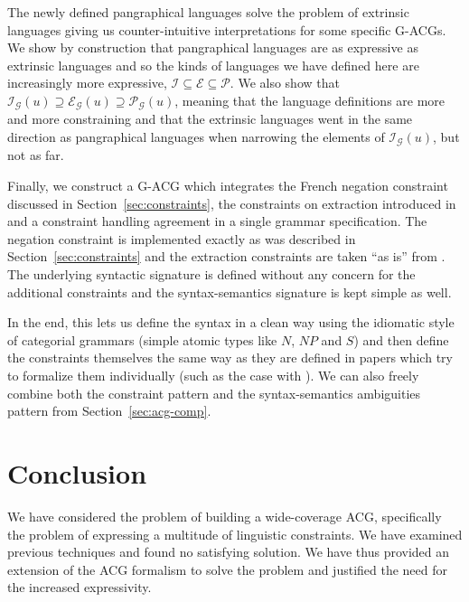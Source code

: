 \documentclass[twocolumn]{article}
\begin{document}
The newly defined pangraphical languages solve the problem of extrinsic
languages giving us counter-intuitive interpretations for some specific
G-ACGs. We show by construction that pangraphical languages are as
expressive as extrinsic languages and so the kinds of languages we have
defined here are increasingly more expressive, $\mathcal{I} \subseteq
\mathcal{E} \subseteq \mathcal{P}$. We also show that
$\mathcal{I}_{\mathcal{G}}(u) \supseteq \mathcal{E}_{\mathcal{G}}(u)
\supseteq \mathcal{P}_{\mathcal{G}}(u)$, meaning that the language
definitions are more and more constraining and that the extrinsic
languages went in the same direction as pangraphical languages when
narrowing the elements of $\mathcal{I}_{\mathcal{G}}(u)$, but not as
far.

Finally, we construct a G-ACG which integrates the French negation
constraint discussed in Section~\ref{sec:constraints}, the constraints
on extraction introduced in \cite{pogodalla2012controlling} and a
constraint handling agreement in a single grammar specification. The
negation constraint is implemented exactly as was described in
Section~\ref{sec:constraints} and the extraction constraints are taken
``as is'' from \cite{pogodalla2012controlling}. The underlying syntactic
signature is defined without any concern for the additional constraints
and the syntax-semantics signature is kept simple as well.

In the end, this lets us define the syntax in a clean way using the
idiomatic style of categorial grammars (simple atomic types like $N$,
$NP$ and $S$) and then define the constraints themselves the same way as
they are defined in papers which try to formalize them individually
(such as the case with \cite{pogodalla2012controlling}). We can also
freely combine both the constraint pattern and the syntax-semantics
ambiguities pattern from Section~\ref{sec:acg-comp}.


\section{Conclusion}

We have considered the problem of building a wide-coverage ACG, specifically
the problem of expressing a multitude of linguistic constraints. We have
examined previous techniques and found no satisfying solution. We have thus
provided an extension of the ACG formalism to solve the problem and justified
the need for the increased expressivity.



\end{document}
